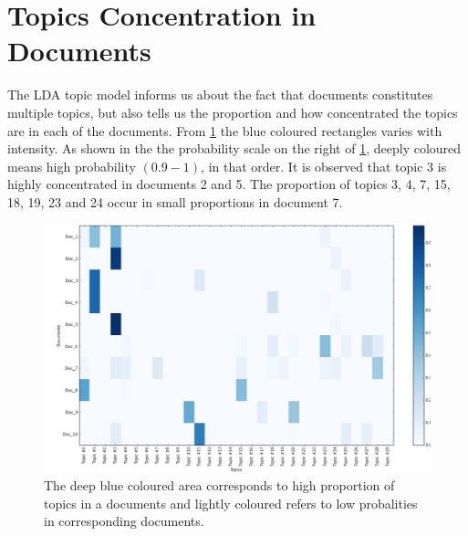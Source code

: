 \section{Topics Concentration in Documents}
The LDA topic model informs us about the fact that documents constitutes multiple topics, but also tells us the proportion and how concentrated the topics are in each of the documents. From \ref{Figure 4.3} the blue coloured rectangles varies with intensity. As shown in the the probability scale on the right of \ref{Figure 4.3}, deeply coloured means high probability $(0.9-1)$, in that order. It is observed that topic 3 is highly concentrated in documents 2 and 5. The proportion of topics 3, 4, 7, 15, 18, 19, 23 and 24 occur in small proportions in document 7.
\begin{figure}[hbtp]
\centering
\includegraphics[scale=0.25]{c4_4_orig.png}
\caption{The deep blue coloured  area corresponds to high proportion of topics in a documents and lightly coloured refers to low probalities in corresponding documents.}\label{Figure 4.3}
\end{figure}
\newpage
